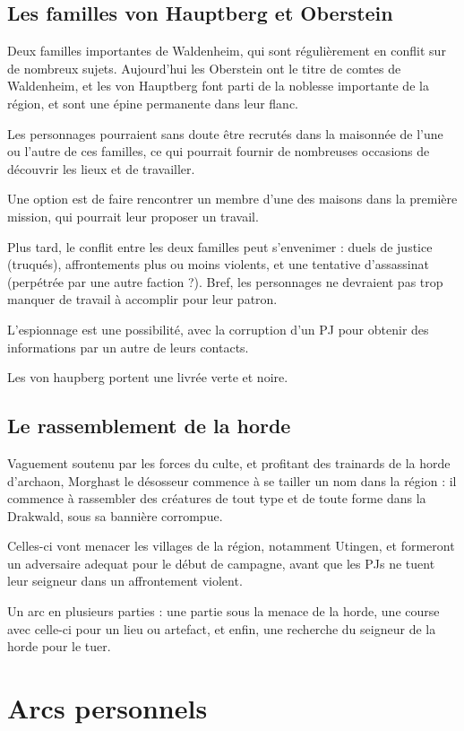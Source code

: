 \documentclass[10pt,a4paper]{book}
\begin{document}
\subsection{Les familles von Hauptberg et Oberstein}

Deux familles importantes de Waldenheim, qui sont régulièrement en conflit sur de nombreux sujets. Aujourd'hui les Oberstein ont le titre de comtes de Waldenheim, et les von Hauptberg font parti de la noblesse importante de la région, et sont une épine permanente dans leur flanc.

Les personnages pourraient sans doute être recrutés dans la maisonnée de l'une ou l'autre de ces familles, ce qui pourrait fournir de nombreuses occasions de découvrir les lieux et de travailler.

Une option est de faire rencontrer un membre d'une des maisons dans la première mission, qui pourrait leur proposer un travail.

Plus tard, le conflit entre les deux familles peut s'envenimer : duels de justice (truqués), affrontements plus ou moins violents, et une tentative d'assassinat (perpétrée par une autre faction ?). Bref, les personnages ne devraient pas trop manquer de travail à accomplir pour leur patron.

L'espionnage est une possibilité, avec la corruption d'un PJ pour obtenir des informations par un autre de leurs contacts.

Les von haupberg portent une livrée verte et noire.

\subsection{Le rassemblement de la horde}
Vaguement soutenu par les forces du culte, et profitant des trainards de la horde d'archaon, Morghast le désosseur commence à se tailler un nom dans la région : il commence à rassembler des créatures de tout type et de toute forme dans la Drakwald, sous sa bannière corrompue.

Celles-ci vont menacer les villages de la région, notamment Utingen, et formeront un adversaire adequat pour le début de campagne, avant que les PJs ne tuent leur seigneur dans un affrontement violent. 

Un arc en plusieurs parties : une partie sous la menace de la horde, une course avec celle-ci pour un lieu ou artefact, et enfin, une recherche du seigneur de la horde pour le tuer.
\section{Arcs personnels}
\end{document}
